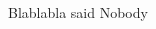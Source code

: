 \documentclass[letterpaper, 10 pt, conference]{ieeeconf}  %
\begin{document}
\section{}


\addtolength{\textheight}{-12cm}   %







\section*{}


\section*{}






Blablabla said Nobody ~\cite{c1}

\begin{thebibliography}{99}

\bibitem{}






\end{thebibliography}
\end{document}
